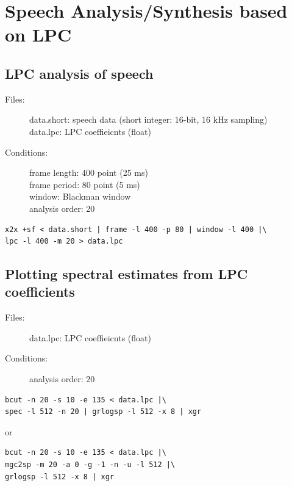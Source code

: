 \documentclass[a4paper]{article}
\begin{document}
\section{Speech Analysis/Synthesis based on LPC}

\subsection{LPC analysis of speech}

\begin{description}
\item[Files:]
  data.short: speech data (short integer: 16-bit, 16 kHz sampling)\\
  data.lpc: LPC coeffieicnts (float)
\item[Conditions:]
  frame length: 400 point (25 ms)\\
  frame period: 80 point (5 ms)\\
  window: Blackman window\\
  analysis order: 20
\end{description}

\begin{verbatim}
x2x +sf < data.short | frame -l 400 -p 80 | window -l 400 |\
lpc -l 400 -m 20 > data.lpc
\end{verbatim}

\subsection{Plotting spectral estimates from LPC coefficients}

\begin{description}
\item[Files:]
  data.lpc: LPC coeffieicnts (float)
\item[Conditions:]
  analysis order: 20
\end{description}

\begin{verbatim}
bcut -n 20 -s 10 -e 135 < data.lpc |\
spec -l 512 -n 20 | grlogsp -l 512 -x 8 | xgr
\end{verbatim}

or

\begin{verbatim}
bcut -n 20 -s 10 -e 135 < data.lpc |\
mgc2sp -m 20 -a 0 -g -1 -n -u -l 512 |\
grlogsp -l 512 -x 8 | xgr
\end{verbatim}
\end{document}

